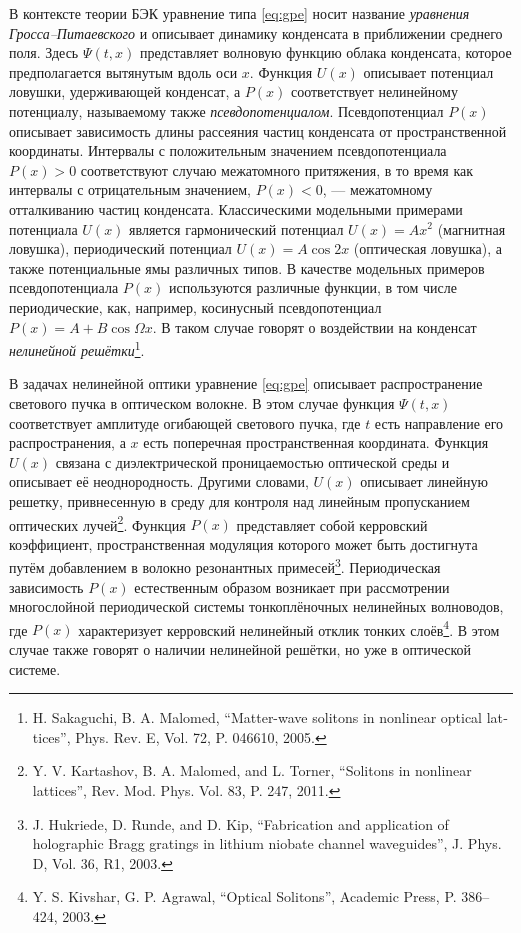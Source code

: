 \documentclass[candidate, href, colorlinks]{disser}
\begin{document}
В контексте теории БЭК уравнение типа \eqref{eq:gpe} носит название {\it уравнения Гросса--Питаевского} и описывает динамику конденсата в приближении среднего поля.
Здесь $\Psi(t, x)$ представляет волновую функцию облака конденсата, которое предполагается вытянутым вдоль оси $x$.
Функция $U(x)$ описывает потенциал ловушки, удерживающей конденсат, а $P(x)$ соответствует нелинейному потенциалу, называемому также {\it псевдопотенциалом}.
Псевдопотенциал $P(x)$ описывает зависимость длины рассеяния частиц конденсата от пространственной координаты.
Интервалы с положительным значением псевдопотенциала $P(x) > 0$ соответствуют случаю межатомного притяжения, в то время как интервалы с отрицательным значением, $P(x) < 0$, ---  межатомному отталкиванию частиц конденсата.
Классическими модельными примерами потенциала $U(x)$ является гармонический потенциал $U(x) = Ax^2$ (магнитная ловушка), периодический потенциал $U(x) = A \cos 2x$ (оптическая ловушка), а также потенциальные ямы различных типов.
В качестве модельных примеров псевдопотенциала $P(x)$ используются различные функции, в том числе периодические, как, например, косинусный псевдопотенциал $P(x) = A + B \cos \Omega x$.
В таком случае говорят о воздействии на конденсат {\it нелинейной решётки}\footnote{\label{note:malomed} H. Sakaguchi,  B. A. Malomed, ``Matter-wave solitons in nonlinear optical lat­tices'', Phys. Rev. E, Vol. 72, P. 046610, 2005.}.

В задачах нелинейной оптики уравнение \eqref{eq:gpe} описывает распространение светового пучка в оптическом волокне.
В этом случае функция $\Psi(t, x)$ соответствует амплитуде огибающей светового пучка, где $t$ есть направление его распространения, а $x$ есть поперечная пространственная координата.
Функция $U(x)$ связана с диэлектрической проницаемостью оптической среды и описывает её неоднородность.
Другими словами, $U(x)$ описывает линейную решетку, привнесенную в среду для контроля над линейным пропусканием оптических лучей\footnote{\label{note:torner} Y. V. Kartashov, B. A. Malomed, and L. Torner, ``Solitons in nonlinear lattices'', Rev. Mod. Phys. Vol. 83, P. 247, 2011.}.
Функция $P(x)$ представляет собой керровский коэффициент, пространственная модуляция которого может быть достигнута путём добавлением в волокно резонантных примесей\footnote{J. Hukriede, D. Runde, and D. Kip, ``Fabrication and application of holographic Bragg gratings in lithium niobate channel waveguides'', J. Phys. D, Vol. 36, R1, 2003.}.
Периодическая зависимость $P(x)$ естественным образом возникает при рассмотрении многослойной периодической системы тонкоплёночных нелинейных волноводов, где $P(x)$ характеризует керровский нелинейный отклик тонких слоёв\footnote{Y. S. Kivshar, G. P. Agrawal, ``Optical Solitons'', Academic Press, P. 386--424, 2003.}.
В этом случае также говорят о наличии нелинейной решётки, но уже в оптической системе.
\end{document}
